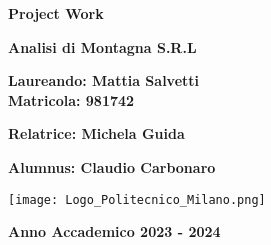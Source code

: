\begin{titlepage}
	\begin{center}
		\vspace*{1cm}

		\vspace{0.5cm}
		\huge\textbf{Project Work}

		\vspace{1.5cm}

		\huge\textbf{Analisi di Montagna S.R.L}

		\vspace{1.5cm}

		\large\textbf{Laureando: Mattia Salvetti}\\
		\large\textbf{Matricola: 981742}

		\vspace{1.5cm}

		\large\textbf{Relatrice: Michela Guida}

		\vspace{0.5cm}

		\large\textbf{Alumnus: Claudio Carbonaro}

		\vfill

		\texttt{[image: Logo\_Politecnico\_Milano.png]}

		\vspace{1cm}

		\large\textbf{Anno Accademico 2023 - 2024}

	\end{center}
\end{titlepage}
